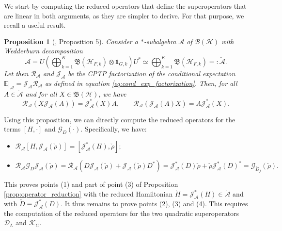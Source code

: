 \documentclass[aihp,12pt]{imsart}
\newcommand{\Dc}{\mathcal{D}}
\newcommand{\Gc}{\mathcal{G}}
\newcommand{\Hc}{\mathcal{H}}
\newcommand{\Jc}{\mathcal{J}}
\newcommand{\Rc}{\mathcal{R}}
\newcommand{\Kc}{\mathcal{K}}
\newcommand{\As}{\mathscr{A}}
\newcommand{\Bf}{\mathfrak{B}}
\newcommand{\CE}{\mathbb{E}|}
\newcommand{\rs}{\mathcal{R}}
\newcommand{\es}{\mathcal{J}}
\newcommand{\one}{\mathbb{1}}
\theoremstyle{theorem}
\newtheorem{proposition}{Proposition}
\theoremstyle{definition}
\theoremstyle{remark}
\begin{document}
We start by computing the reduced operators that define the superoperators that are linear in both arguments, as they are simpler to derive. For that purpose, we recall a useful result.
\begin{proposition}[\cite{prxq2024}, Proposition 5]
\label{prop:combining_reduction_injection}
    Consider a $*$-subalgebra $\mathscr{A}$ of $\mathcal{B(H)}$ with Wedderburn decomposition $$\As = U\left(\bigoplus_{k=1}^K \Bf(\Hc_{F,k})\otimes \one_{G,k} \right)U^* \simeq \bigoplus_{k=1}^K \Bf(\Hc_{F,k}) =: \check{\As}.$$ Let then $\rs_{\As}$ and $\es_{\As}$ be the CPTP factorization of the conditional expectation $\CE_\mathscr{A} = \es_\As\rs_\As$ as defined in equation \eqref{eq:cond_exp_factorization}. Then, for all $A\in\check{\As}$ and for all $X\in\Bf(\Hc)$, we have  
    \begin{equation}
    \rs_\As(X \es_\As(A)) = \es_\As^*(X) A, \qquad 
    \rs_\As(\es_\As(A) X) = A \es_\As^*(X).
    \end{equation}
\end{proposition}

Using this proposition, we can directly compute the reduced operators for the terms $[H,\cdot]$ and $\Gc_{D}(\cdot)$. Specifically, we have: 
\begin{itemize}
    \item $\Rc_\As[H,\Jc_\As(\check{\rho})] = [\Jc_\As^*(H),\check{\rho}];$ 
    \item $\Rc_\As\Gc_{D} \Jc_\As(\check{\rho}) = \Rc_\As(D \Jc_\As(\check{\rho}) + \Jc_\As(\check{\rho}) D^*) = \Jc_\As^*(D)\check{\rho} + \check{\rho} \Jc_\As^*(D)^* = \Gc_{\check{D}_j}(\check{\rho}).$
\end{itemize}
This proves points (1) and part of point (3) of Proposition \ref{prop:operator_reduction} with the reduced Hamiltonian $\check{H} = \Jc_\As^*(H)\in\check{\As}$ and with $\check{D} \equiv \Jc_\As^*(D)$.
It thus remains to prove points (2), (3) and (4). This requires the computation of the reduced operators for the two quadratic superoperators $\Dc_{L}$ and $\Kc_{C}$.
\end{document}
